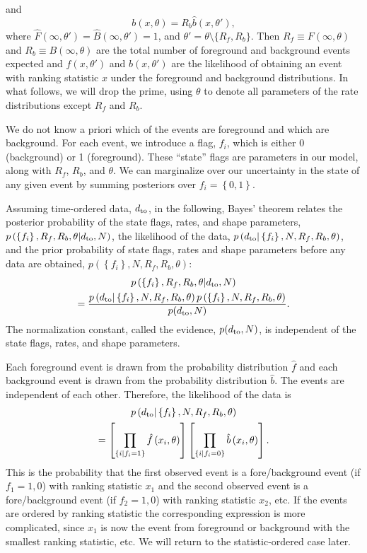 \documentclass[aps,prd,reprint,nofootinbib]{revtex4-1}
\newcommand{\mathset}[1]{\left\{ #1 \right\}}
\begin{document}
and
\begin{equation}
  b(x, \theta) = R_b \hat{b}(x, \theta'),
\end{equation}
where $\hat{F}(\infty, \theta') = \hat{B}(\infty, \theta') = 1$, and
$\theta' = \theta \setminus \{R_{f}, R_{b} \}$.  Then $R_f \equiv
F(\infty,\theta)$ and $R_b \equiv B(\infty,\theta)$ are the total
number of foreground and background events expected and $\hat{f}(x,
\theta')$ and $\hat{b}(x, \theta')$ are the likelihood of obtaining an
event with ranking statistic $x$ under the foreground and background
distributions.  In what follows, we will drop the prime, using
$\theta$ to denote all parameters of the rate distributions except
$R_f$ and $R_b$.

We do not know a priori which of the events are foreground and which
are background.  For each event, we introduce a flag, $f_i$, which is
either 0 (background) or 1 (foreground).  These ``state'' flags are
parameters in our model, along with $R_f$, $R_b$, and $\theta$.  We
can marginalize over our uncertainty in the state of any given event
by summing posteriors over $f_i = \mathset{0,1}$.

Assuming time-ordered data, $d_{\rm to}$, in the following, Bayes'
theorem relates the posterior probability of the state flags, rates,
and shape parameters, $p\left(\mathset{f_i}, R_f, R_b, \theta | d_{\rm
  to}, N \right)$, the likelihood of the data, $p\left( d_{\rm to} |
\mathset{f_i}, N, R_f, R_b, \theta\right)$, and the prior probability
of state flags, rates and shape parameters before any data are
obtained, $p\left( \mathset{f_i}, N, R_f, R_b, \theta\right)$:
\begin{multline}
  \label{eq:Bayes}
  p\left(\mathset{f_i}, R_f, R_b, \theta | d_{\rm to}, N \right) \\ =
  \frac{p\left( d_{\rm to} | \mathset{f_i}, N, R_f, R_b, \theta\right)
    p\left(\mathset{f_i}, N, R_f, R_b, \theta\right)}{p(d_{\rm to},
    N)}.
\end{multline}
The normalization constant, called the evidence, $p(d_{\rm to}, N)$,
is independent of the state flags, rates, and shape parameters.

Each foreground event is drawn from the probability distribution
$\hat{f}$ and each background event is drawn from the probability
distribution $\hat{b}$.  The events are independent of each other.
Therefore, the likelihood of the data is
\begin{multline}
  p\left( d_{\rm to} | \mathset{f_i}, N, R_f, R_b, \theta\right) \\ =
  \left[ \prod_{\mathset{i | f_i = 1}} \hat{f}\left(x_i, \theta\right)
    \right] \left[ \prod_{\mathset{i | f_i = 0}} \hat{b}\left( x_i,
    \theta\right) \right].
\end{multline}
This is the probability that the first observed event is a
fore/background event (if $f_1=1,0$) with ranking statistic $x_1$ and
the second observed event is a fore/background event (if $f_2=1,0$)
with ranking statistic $x_2$, etc. If the events are ordered by ranking
statistic the corresponding expression is more complicated, since
$x_1$ is now the event from foreground or background with the smallest
ranking statistic, etc. We will return to the statistic-ordered case
later.
\end{document}

